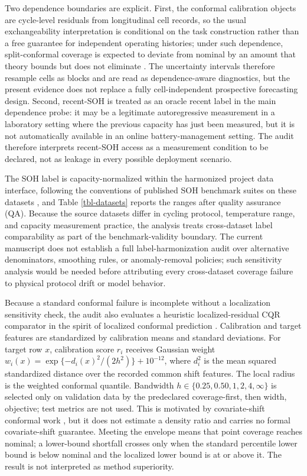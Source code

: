 \documentclass[
  number,
  preprint]{elsarticle}
\begin{document}
Two dependence boundaries are explicit. First, the conformal calibration
objects are cycle-level residuals from longitudinal cell records, so the
usual exchangeability interpretation is conditional on the task
construction rather than a free guarantee for independent operating
histories; under such dependence, split-conformal coverage is expected
to deviate from nominal by an amount that theory bounds but does not
eliminate \citep{oliveira2024split, xu2023conformal}. The uncertainty
intervals therefore resample cells as blocks and are read as
dependence-aware diagnostics, but the present evidence does not replace
a fully cell-independent prospective forecasting design. Second,
recent-SOH is treated as an oracle recent label in the main dependence
probe: it may be a legitimate autoregressive measurement in a laboratory
setting where the previous capacity has just been measured, but it is
not automatically available in an online battery-management setting. The
audit therefore interprets recent-SOH access as a measurement condition
to be declared, not as leakage in every possible deployment scenario.

The SOH label is capacity-normalized within the harmonized project data
interface, following the conventions of published SOH benchmark suites
on these datasets \citep{wang2024open, zhang2024reliability}, and Table
\ref{tbl-datasets} reports the ranges after quality assurance (QA).
Because the source datasets differ in cycling protocol, temperature
range, and capacity measurement practice, the analysis treats
cross-dataset label comparability as part of the benchmark-validity
boundary. The current manuscript does not establish a full
label-harmonization audit over alternative denominators, smoothing
rules, or anomaly-removal policies; such sensitivity analysis would be
needed before attributing every cross-dataset coverage failure to
physical protocol drift or model behavior.

Because a standard conformal failure is incomplete without a
localization sensitivity check, the audit also evaluates a heuristic
localized-residual CQR comparator in the spirit of localized conformal
prediction \citep{guan2022localized}. Calibration and target features
are standardized by calibration means and standard deviations. For
target row \(x\), calibration score \(r_i\) receives Gaussian weight
\(w_i(x)=\exp\{-d_i(x)^2/(2h^2)\}+10^{-12}\), where \(d_i^2\) is the
mean squared standardized distance over the recorded common shift
features. The local radius is the weighted conformal quantile. Bandwidth
\(h\in\{0.25,0.50,1,2,4,\infty\}\) is selected only on validation data
by the predeclared coverage-first, then width, objective; test metrics
are not used. This is motivated by covariate-shift conformal work
\citep{tibshirani2019covariate}, but it does not estimate a density
ratio and carries no formal covariate-shift guarantee. Meeting the
envelope means that point coverage reaches nominal; a lower-bound
shortfall crosses only when the standard percentile lower bound is below
nominal and the localized lower bound is at or above it. The result is
not interpreted as method superiority.
\end{document}
